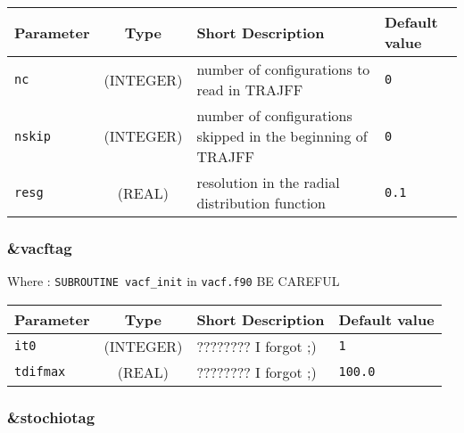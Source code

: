\documentclass[a4paper,8pt]{article}
\begin{document}
\begin{longtable}{l|c|m{8cm}|m{2cm}}
\hline
\hline
Parameter        &  Type              &          Short Description                                                          & Default value \\
\hline
\hline
\rule[-0.75cm]{0cm}{1.5cm}
\verb?nc?        & (INTEGER)          & number of configurations to read in TRAJFF                                          & \verb?0? \\
\rule[-0.75cm]{0cm}{1.5cm}
\verb?nskip?     & (INTEGER)          & number of configurations skipped in the beginning of TRAJFF                         & \verb?0? \\
\rule[-0.75cm]{0cm}{1.5cm}
\verb?resg?      & (REAL)             & resolution in the radial distribution function                                      & \verb?0.1? \\
\hline
\hline
\end{longtable}

\subsubsection{\&vacftag}

Where : \verb?SUBROUTINE vacf_init? in \verb?vacf.f90?
BE CAREFUL
\newline

\begin{longtable}{l|c|m{8cm}|m{2cm}}
\hline
\hline
Parameter        &  Type              &          Short Description                                                          & Default value \\
\hline
\hline
\rule[-0.75cm]{0cm}{1.5cm}
\verb?it0?       & (INTEGER)          & ???????? I forgot ;)                                                                & \verb?1? \\
\hline
\rule[-0.75cm]{0cm}{1.5cm}
\verb?tdifmax?   & (REAL)             & ???????? I forgot ;)                                                                & \verb?100.0? \\ 
\hline
\hline
\end{longtable}

\subsubsection{\&stochiotag }
\end{document}
